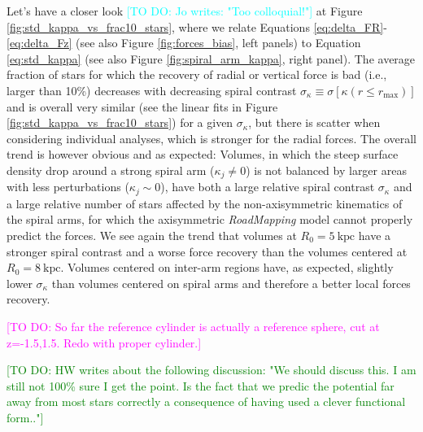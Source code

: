 \documentclass[iop,revtex4,numberedappendix,appendixfloats]{emulateapj}
\newcommand{\RM}{{\sl RoadMapping}}
\newcommand{\Wilma}[1]{\textcolor{Magenta}{#1}}
\newcommand{\HW}[1]{\textcolor{Green}{#1}}
\newcommand{\Jo}[1]{\textcolor{Cyan}{#1}}
\begin{document}
Let's have a closer look \Jo{[TO DO: Jo writes: "Too colloquial!"]} at Figure \ref{fig:std_kappa_vs_frac10_stars}, where we relate Equations \eqref{eq:delta_FR}-\eqref{eq:delta_Fz} (see also Figure \ref{fig:forces_bias}, left panels) to Equation \eqref{eq:std_kappa} (see also Figure \ref{fig:spiral_arm_kappa}, right panel). The average fraction of stars for which the recovery of radial or vertical force is bad (i.e., larger than 10\%) decreases with decreasing spiral contrast $\sigma_\kappa \equiv \sigma[\kappa(r \leq r_\text{max})]$ and is overall very similar (see the linear fits in Figure \ref{fig:std_kappa_vs_frac10_stars}) for a given $\sigma_\kappa$, but there is scatter when considering individual analyses, which is stronger for the radial forces. The overall trend is however obvious and as expected: Volumes, in which the steep surface density drop around a strong spiral arm ($\kappa_j \neq 0$) is not balanced by larger areas with less perturbations ($\kappa_j \sim 0$), have both a large relative spiral contrast $\sigma_\kappa$ and a large relative number of stars affected by the non-axisymmetric kinematics of the spiral arms, for which the axisymmetric \RM{} model cannot properly predict the forces. We see again the trend that volumes at $R_0=5~\text{kpc}$ have a stronger spiral contrast and a worse force recovery than the volumes centered at $R_0=8~\text{kpc}$. Volumes centered on inter-arm regions have, as expected, slightly lower $\sigma_\kappa$ than volumes centered on spiral arms and therefore a better local forces recovery.

\Wilma{[TO DO: So far the reference cylinder is actually a reference sphere, cut at z=-1.5,1.5. Redo with proper cylinder.]}

\HW{[TO DO: HW writes about the following discussion: "We should discuss this. I am still not 100\% sure I get the point. Is the fact that we predic the potential far away from most stars correctly a consequence of having used a clever functional form.."]}
\end{document}
